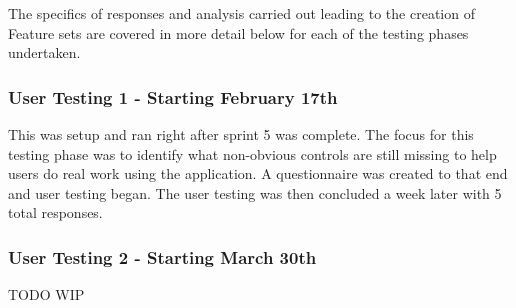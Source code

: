 The specifics of responses and analysis carried out leading to the creation of Feature sets are covered in more detail below for each of the testing phases undertaken.


\subsubsection{User Testing 1 - Starting February 17th}
This was setup and ran right after sprint 5 was complete. The focus for this testing phase was to identify what non-obvious controls are still missing to help users do real work using the application. A questionnaire was created to that end and user testing began.
The user testing was then concluded a week later with 5 total responses.

\subsubsection{User Testing 2 - Starting March 30th}
TODO WIP

